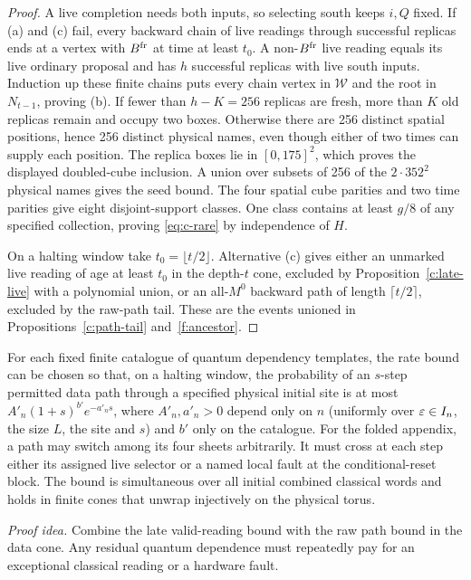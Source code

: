 \begin{proof}
A live completion needs both inputs, so selecting south keeps
\(i,Q\) fixed. If (a) and (c) fail, every backward chain of live
readings through successful replicas ends at a vertex with \(B^{\rm fr}\)
at time at least \(t_0\). A non-\(B^{\rm fr}\) live reading equals its live
ordinary proposal and has \(h\) successful replicas with live south
inputs. Induction up these finite chains puts every chain vertex
in \(\mathcal W\) and the root in \(N_{t-1}\), proving (b).
If fewer than \(h-K=256\) replicas are fresh, more than \(K\)
old replicas remain and occupy two boxes. Otherwise there are 256
distinct spatial positions, hence 256 distinct physical names, even
though either of two times can supply each position. The replica
boxes lie in \([0,175]^2\), which proves the displayed doubled-cube
inclusion. A union over subsets of 256 of the \(2\cdot352^2\)
physical names gives the seed bound. The four spatial cube parities
and two time parities give eight disjoint-support classes. One class
contains at least \(g/8\) of any specified collection, proving
\eqref{eq:c-rare} by independence of \(H\).

On a halting window take \(t_0=\lfloor t/2\rfloor\). Alternative
(c) gives either an unmarked live reading of age at least \(t_0\)
in the depth-\(t\) cone, excluded by Proposition~\ref{c:late-live}
with a polynomial union, or an all-\(M^0\) backward path of length
\(\lceil t/2\rceil\), excluded by the raw-path tail. These are the
events unioned in Propositions~\ref{c:path-tail} and~\ref{f:ancestor}.
\end{proof}

\begin{proposition}\label{c:path-tail}
For each fixed finite catalogue of quantum dependency templates, the
rate bound can be chosen so that, on a halting window, the probability of
an \(s\)-step permitted data path through a specified physical initial
site is at most \(A'_n(1+s)^{b'}e^{-a'_ns}\), where \(A'_n,a'_n>0\)
depend only on \(n\) (uniformly over \(\varepsilon\in I_n\), the size \(L\), the
site and \(s\)) and \(b'\) only on the catalogue. For the folded appendix, a path may switch among its four sheets
arbitrarily. It must cross at each step either its assigned live
selector or a named local fault at the conditional-reset block. The bound is
simultaneous over all initial combined classical words and holds in
finite cones that unwrap injectively on the physical torus.
\end{proposition}
\par\noindent\emph{Proof idea.} Combine the late valid-reading bound with the raw path bound in the data cone. Any residual quantum dependence must repeatedly pay for an exceptional classical reading or a hardware fault.

